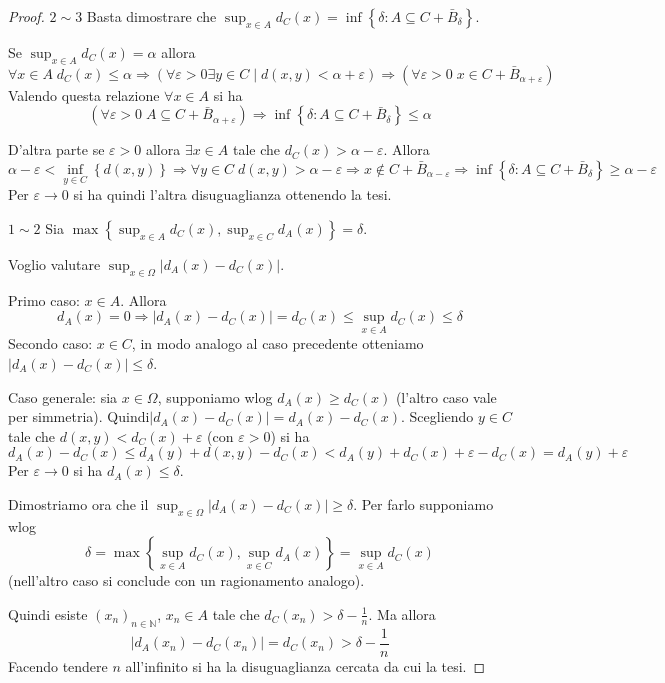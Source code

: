 \documentclass[a4paper,10pt]{article}
\theoremstyle{plain}
\theoremstyle{definition}
\theoremstyle{remark}
\newcommand{\set}[1]{\left\{#1\right\}}
\newcommand{\pa}[1]{\left(#1\right)}
\newcommand{\abs}[1]{\left|#1\right|}
\begin{document}
\begin{proof}
  \textbf{$2 \sim 3$} Basta dimostrare che $\sup _{x\in A} d_C(x) =
  \inf \set{ \delta : A \subseteq C + \bar B _{\delta}}$.

  Se $\sup _{x\in A} d_C(x) = \alpha$ allora
  \[ \forall x \in A \; d_C (x) \le \alpha \Rightarrow \pa{\forall
    \varepsilon > 0 \exists y \in C \mid d(x,y) < \alpha +
    \varepsilon} \Rightarrow \pa{\forall \varepsilon > 0 \; x
    \in C + \bar B _{\alpha + \varepsilon}}\]
  Valendo questa relazione $\forall x \in A$ si ha
  \[ \pa{\forall \varepsilon > 0 \; A \subseteq C + \bar B _{\alpha +
      \varepsilon}} \Rightarrow \inf \set{ \delta : A \subseteq C +
    \bar B _{\delta}} \le \alpha \]

  D'altra parte se $\varepsilon > 0$ allora $\exists x \in A$ tale che
  $d_C(x) > \alpha - \varepsilon$. Allora
  \[ \alpha - \varepsilon < \inf_{y\in C}\set{d(x,y)} \Rightarrow
  \forall y \in C\; d(x,y) > \alpha - \varepsilon \Rightarrow x\not\in
  C + \bar B_{\alpha - \varepsilon} \Rightarrow \inf \set{ \delta : A
    \subseteq C + \bar B _{\delta}} \ge \alpha - \varepsilon\]
  Per $\varepsilon \rightarrow 0$ si ha quindi l'altra disuguaglianza
  ottenendo la tesi.

  \textbf{$1\sim 2$}
  Sia $\max \set{\sup _{x\in A} d_C (x) , \sup _{x\in C} d_A (x) } =
  \delta$.
  
  Voglio valutare $\sup_{x\in \Omega} \abs{d_A(x)-d_C(x)}$.

  Primo caso: $x\in A$. Allora
  \[ d_A(x) = 0 \Rightarrow \abs{d_A(x)-d_C(x)} = d_C(x) \le \sup
  _{x\in A} d_C (x) \le \delta \]
  Secondo caso: $x\in C$, in modo analogo al caso precedente otteniamo
  $\abs{d_A(x)-d_C(x)} \le \delta$.
  
  Caso generale: sia $x\in \Omega$, supponiamo wlog $d_A(x) \ge d_C(x)$
  (l'altro caso vale per simmetria). Quindi$\abs{d_A(x)-d_C(x)} =
  d_A(x)-d_C(x)$. Scegliendo $y \in C$ tale che $d(x,y) < d_C(x) +
  \varepsilon$ (con $\varepsilon > 0$) si ha
  \[ d_A(x)-d_C(x) \le d_A(y) + d(x,y) - d_C(x) < d_A(y) + d_C(x) +
  \varepsilon -d_C(x) = d_A(y) + \varepsilon\]
  Per $\varepsilon \rightarrow 0$ si ha $d_A(x) \le \delta$.

  Dimostriamo ora che il $\sup_{x\in \Omega} \abs{d_A(x)-d_C(x)} \ge
  \delta$. Per farlo supponiamo wlog 
  \[ \delta = \max \set{\sup _{x\in A} d_C (x) , \sup _{x\in C} d_A
    (x) } = \sup _{x\in A} d_C (x) \] 
  (nell'altro caso si conclude con un ragionamento analogo).

  Quindi esiste $\pa{x_n}_{n\in\mathbb{N}}$, $x_n\in A$ tale che
  $d_C(x_n) > \delta - \frac{1}{n}$. Ma allora
  \[ \abs{d_A(x_n) - d_C(x_n)} = d_C(x_n) > \delta - \frac{1}{n} \]
  Facendo tendere $n$ all'infinito si ha la disuguaglianza cercata da
  cui la tesi.
\end{proof}
\end{document}

